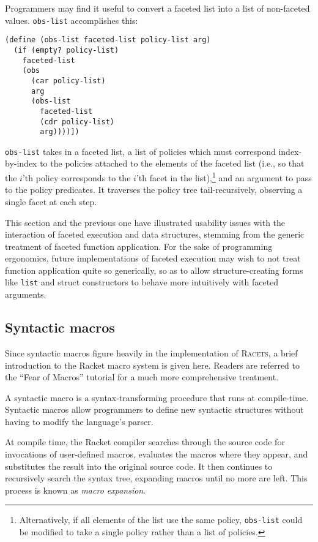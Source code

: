 \documentclass{article}
\begin{document}
Programmers may find it useful to convert a faceted list into a list of non-faceted values. \texttt{obs-list} accomplishes this:

\begin{lstlisting}
(define (obs-list faceted-list policy-list arg)
  (if (empty? policy-list)
    faceted-list
    (obs
      (car policy-list)
      arg
      (obs-list
        faceted-list
        (cdr policy-list)
        arg))))])
\end{lstlisting}

\texttt{obs-list} takes in a faceted list, a list of policies which must correspond index-by-index to the policies attached to the elements of the faceted list (i.e., so that the $i$'th policy corresponds to the $i$'th facet in the list),\footnote{Alternatively, if all elements of the list use the same policy, \texttt{obs-list} could be modified to take a single policy rather than a list of policies.} and an argument to pass to the policy predicates. It traverses the policy tree tail-recursively, observing a single facet at each step.

This section and the previous one have illustrated usability issues with the interaction of faceted execution and data structures, stemming from the generic treatment of faceted function application. For the sake of programming ergonomics, future implementations of faceted execution may wish to not treat function application quite so generically, so as to allow structure-creating forms like \texttt{list} and struct constructors to behave more intuitively with faceted arguments.


\subsection{Syntactic macros}
Since syntactic macros figure heavily in the implementation of \textsc{Racets}, a brief introduction to the Racket macro system is given here. Readers are referred to the ``Fear of Macros'' tutorial \cite{fear-of-macros} for a much more comprehensive treatment.

A syntactic macro is a syntax-transforming procedure that runs at compile-time. Syntactic macros allow programmers to define new syntactic structures without having to modify the language's parser.

At compile time, the Racket compiler searches through the source code for invocations of user-defined macros, evaluates the macros where they appear, and substitutes the result into the original source code. It then continues to recursively search the syntax tree, expanding macros until no more are left. This process is known as \textit{macro expansion}.
\end{document}
